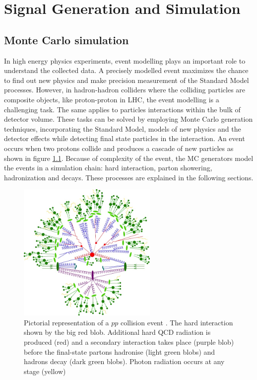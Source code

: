 \graphicspath{{chapt_dutch/}{intro/}{chapt2/}{chapt3/}{chapt4/}{chapt5/}{chapt6/}{chapt7/}{chapt8/}}

\renewcommand\evenpagerightmark{{\scshape\small Chapter 4}}
\renewcommand\oddpageleftmark{{\scshape\small Signal Generation and Simulation}}

\renewcommand{\bibname}{References}

\hyphenation{}

\chapter[Signal Generation and Simulation]%
{Signal Generation and Simulation}\label{chapt:4}
\section{Monte Carlo simulation}\label{sec:mc_sim}
In high energy physics experiments, event modelling plays an important role to understand the collected data. A precisely modelled event maximizes the chance to find out new physics and make precision measurement of the Standard Model processes. However, in hadron-hadron colliders where the colliding particles are composite objects, like proton-proton in LHC, the event modelling is a challenging task. The same applies to particles interactions within the bulk of detector volume. These tasks can be solved by employing Monte Carlo generation techniques, incorporating the Standard Model, models of new physics and the detector effects while detecting final state particles in the interaction. An event occurs when two protons collide and produces a cascade of new particles as shown in figure \ref{fig:event}. Because of complexity of the event, the MC generators model the events in a simulation chain: hard interaction, parton showering, hadronization and decays. These processes are explained in the following sections.
\begin{figure}[h]
\centering
\includegraphics[width=0.6\textwidth]{fig/chapt4/event_sim.jpeg}
\caption{\label{fig:event}Pictorial representation of a $pp$ collision event \cite{simulated_event}. The hard interaction shown by the big red blob. Additional hard QCD radiation is produced (red) and a secondary interaction takes place (purple blob) before the final-state partons hadronise (light green blobs) and hadrons decay (dark green blobs). Photon radiation occurs at any stage (yellow)}
\end{figure}  

